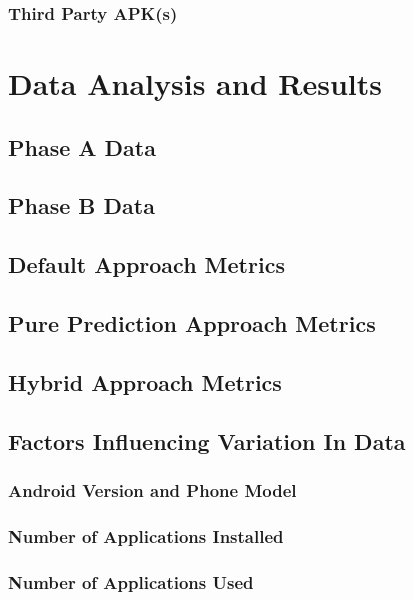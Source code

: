 \documentclass[12pt]{uthesis-v12}  %
\begin{document}
		\subsection{Third Party APK(s)}

\chapter{Data Analysis and Results}
	
	\section{Phase A Data}
	
	\section{Phase B Data}
	
	\section{Default Approach Metrics}
	
	\section{Pure Prediction Approach Metrics}
	
	\section{Hybrid Approach Metrics}
	
	\section{Factors Influencing Variation In Data}
		
		\subsection{Android Version and Phone Model}
		
		\subsection{Number of Applications Installed}
		
		\subsection{Number of Applications Used}
		
\end{document}

